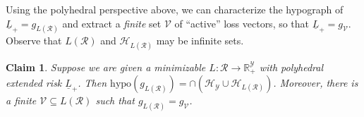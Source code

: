 \documentclass[11pt]{article}
\newcommand{\reals}{\mathbb{R}}
\renewcommand{\H}{\mathcal{H}}
\newcommand{\R}{\mathcal{R}}
\newcommand{\V}{\mathcal{V}}
\newcommand{\Y}{\mathcal{Y}}
\newcommand{\risk}[1]{\underline{#1}}
\newcommand{\hyp}{\mathrm{hypo}}
\newtheorem{claim}{Claim}
\begin{document}
Using the polyhedral perspective above, we can characterize the hypograph of $\risk L_+ = g_{L(\R)}$ and extract a \emph{finite} set $\V$ of ``active'' loss vectors, so that $\risk L_+ = g_\V$.
Observe that $L(\R)$ and $\H_{L(\R)}$ may be infinite sets.  
\begin{claim}\label{claim:gV-equals-riskL}
	Suppose we are given a minimizable $L : \R \to \reals^\Y_+$ with polyhedral extended risk $\risk L_+$.
	Then $\hyp(g_{L(\R)}) = \cap(\H_\Y \cup \H_{L(\R)})$.
	Moreover, there is a finite $\V \subseteq L(\R)$ such that $g_{L(\R)} = g_{\V}$. %
\end{claim}
\end{document}

